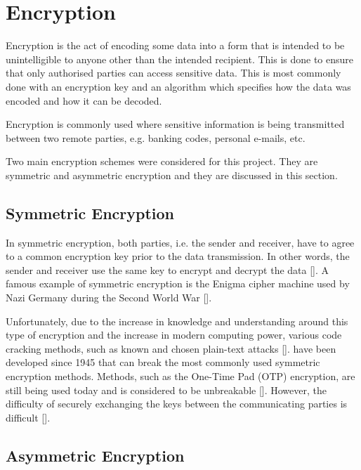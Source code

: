\section{Encryption}

Encryption is the act of encoding some data into a form that is intended to be
unintelligible to anyone other than the intended recipient.
This is done to ensure that only authorised parties can access sensitive data.
This is most commonly done with an encryption key and an algorithm which
specifies how the data was encoded and how it can be decoded.

Encryption is commonly used where sensitive information is being transmitted between
two remote parties, e.g. banking codes, personal e-mails, etc.

Two main encryption schemes were considered for this project. They are symmetric
and asymmetric encryption and they are discussed in this section.

\subsection{Symmetric Encryption}

In symmetric encryption, both parties, i.e. the sender and receiver, have to agree to a common
encryption key prior to the data transmission. In other words, the sender and receiver use the
same key to encrypt and decrypt the data [\cite{article:symm-encryption}]. A famous example
of symmetric encryption is the Enigma cipher machine used by Nazi Germany
during the Second World War [\cite{article:enigma}].

Unfortunately, due to the increase in knowledge and understanding around this type of
encryption and the increase in modern computing power, various code cracking
methods, such as known and chosen plain-text attacks 
[\cite{journal:cypher-attacks}]. have been developed since 1945 that can break
the most commonly used symmetric encryption methods. Methods, such as the
One-Time Pad (OTP) encryption, are still being used today and is considered to
be unbreakable [\cite{article:otp}]. However, the difficulty of securely
exchanging the keys between the communicating parties is difficult
[\cite{article:otp}].

\subsection{Asymmetric Encryption}
\label{sec:assymetric-encryption}

